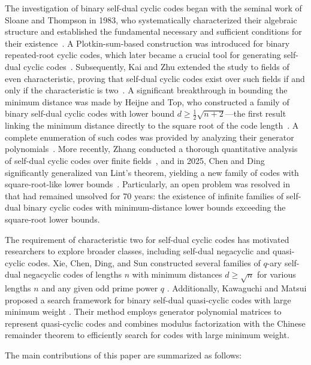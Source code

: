 \documentclass[10pt,a4paper]{amsart}
\begin{document}
The investigation of binary self-dual cyclic codes began with the seminal work of Sloane and Thompson in 1983, who systematically characterized their algebraic structure and established the fundamental necessary and sufficient conditions for their existence~\cite{1056682}. A Plotkin-sum-based construction was introduced for binary repeated-root cyclic codes, which later became a crucial tool for generating self-dual cyclic codes~\cite{75250}. Subsequently, Kai and Zhu extended the study to fields of even characteristic, proving that self-dual cyclic codes exist over such fields if and only if the characteristic is two~\cite{2008On}. A significant breakthrough in bounding the minimum distance was made by Heijne and Top, who constructed a family of binary self-dual cyclic codes with lower bound $d \ge \frac{1}{2}\sqrt{n+2}$---the first result linking the minimum distance directly to the square root of the code length~\cite{5290289}.  A complete enumeration of such codes was provided by analyzing their generator polynomials~\cite{5730592}. More recently, Zhang conducted a thorough quantitative analysis of self-dual cyclic codes over finite fields~\cite{2024The}, and in 2025, Chen and Ding significantly generalized van Lint's theorem, yielding a new family of codes with square-root-like lower bounds~\cite{10856234}. Particularly, an open problem was resolved in~~\cite{wang2026constructionsselfdualbinarycyclic} that had remained unsolved for 70 years: the existence of infinite families of self-dual binary cyclic codes with minimum-distance lower bounds exceeding the square-root lower bounds.

The requirement of characteristic two for self-dual cyclic codes has motivated researchers to explore broader classes, including self-dual negacyclic and quasi-cyclic codes. Xie, Chen, Ding, and Sun  constructed several families of $q$-ary self-dual negacyclic codes of lengths $n$ with minimum distances $d \ge \sqrt{n}$ for various lengths $n$ and any given odd prime power $q$ \cite{10478023}. Additionally, Kawaguchi and Matsui proposed a search framework for binary self-dual quasi-cyclic codes with large minimum weight \cite{9366205}. Their method employs generator polynomial matrices to represent quasi-cyclic codes and combines modulus factorization with the Chinese remainder theorem to efficiently search for codes with large minimum weight.

The main contributions of this paper are summarized as follows:
\end{document}
